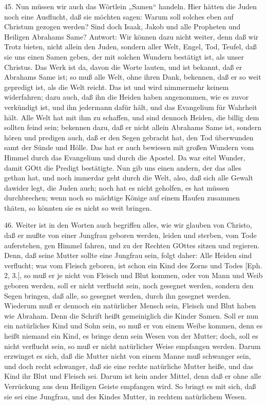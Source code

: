 45. Nun müssen wir auch das Wörtlein „Samen“ handeln. Hier hätten die Juden noch eine Ausflucht, daß sie möchten sagen: Warum soll solches eben auf Christum gezogen werden? Sind doch Isaak, Jakob und alle Propheten und Heiligen Abrahams Same? Antwort: Wir können dazu nicht weiter, denn daß wir Trotz bieten, nicht allein den Juden, sondern aller Welt, Engel, Tod, Teufel, daß sie uns einen Samen geben, der mit solchen Wundern bestätigt ist, als unser Christus. Das Werk ist da, davon die Worte lauten, und ist bekannt, daß er Abrahams Same ist; so muß alle Welt, ohne ihren Dank, bekennen, daß er so weit gepredigt ist, als die Welt reicht. Das ist und wird nimmermehr keinem widerfahren; dazu auch, daß ihn die Heiden haben angenommen, wie es zuvor verkündigt ist, und ihn jedermann dafür hält, und das Evangelium für Wahrheit hält. Alle Welt hat mit ihm zu schaffen, und sind dennoch Heiden, die billig dem sollten feind sein; bekennen dazu, daß er nicht allein Abrahams Same ist, sondern hören und predigen auch, daß er den Segen gebracht hat, den Tod überwunden samt der Sünde und Hölle. Das hat er auch bewiesen mit großen Wundern vom Himmel durch das Evangelium und durch die Apostel. Da war eitel Wunder, damit GOtt die Predigt bestätigte. Nun gib uns einen andern, der das alles gethan hat, und noch immerdar geht durch die Welt, also, daß sich alle Gewalt dawider legt, die Juden auch; noch hat es nicht geholfen, es hat müssen durchbrechen; wenn noch so mächtige Könige auf einem Haufen zusammen thäten, so könnten sie es nicht so weit bringen.

46. Weiter ist in den Worten auch begriffen alles, wie wir glauben von Christo, daß er mußte von einer Jungfrau geboren werden, leiden und sterben, vom Tode auferstehen, gen Himmel fahren, und zu der Rechten GOttes sitzen und regieren. Denn, daß seine Mutter sollte eine Jungfrau sein, folgt daher: Alle Heiden sind verflucht; was vom Fleisch geboren, ist schon ein Kind des Zorns und Todes [Eph. 2, 3.], so muß er je nicht von Fleisch und Blut kommen, oder von Mann und Weib geboren werden, soll er nicht verflucht sein, noch gesegnet werden, sondern den Segen bringen, daß alle, so gesegnet werden, durch ihn gesegnet werden. Wiederum muß er dennoch ein natürlicher Mensch sein, Fleisch und Blut haben wie Abraham. Denn die Schrift heißt gemeiniglich die Kinder Samen. Soll er nun ein natürliches Kind und Sohn sein, so muß er von einem Weibe kommen, denn es heißt niemand ein Kind, es bringe denn sein Wesen von der Mutter; doch, soll es nicht verflucht sein, so muß er nicht natürlicher Weise empfangen werden. Darum erzwinget es sich, daß die Mutter nicht von einem Manne muß schwanger sein, und doch recht schwanger, daß sie eine rechte natürliche Mutter heiße, und das Kind ihr Blut und Fleisch sei. Darum ist kein ander Mittel, denn daß er ohne alle Verrückung aus dem Heiligen Geiste empfangen wird. So bringt es mit sich, daß sie sei eine Jungfrau, und des Kindes Mutter, in rechtem natürlichem Wesen.

